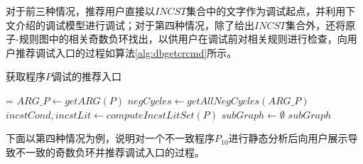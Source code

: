 对于前三种情况，推荐用户直接以$INCST$集合中的文字作为调试起点，并利用下文介绍的调试模型进行调试；对于第四种情况，除了给出$INCST$集合外，还将原子-规则图中的相关奇数负环找出，以供用户在调试前对相关规则进行检查，向用户推荐调试入口的过程如算法\ref{alg:dbgetcrcmd}所示。

\begin{algorithm2e}[H]
    \DontPrintSemicolon
    \SetNoFillComment
    \caption{获取程序$P$调试的推荐入口}
    \label{alg:dbgetcrcmd}
    \setcounter{AlgoLine}{0}
    \everypar={\nl}
    $ARG\_P \gets getARG(P)$ 
    $negCycles \gets getAllNegCycles(ARG\_P)$ 
    $incstCond, incstLit \gets computeIncstLitSet(P)$\;
    {
        $subGraph \gets \emptyset$\;
        \Return $subGraph$
    }
\end{algorithm2e}

下面以第四种情况为例，说明对一个不一致程序$P_{10}$进行静态分析后向用户展示导致不一致的奇数负环并推荐调试入口的过程。

